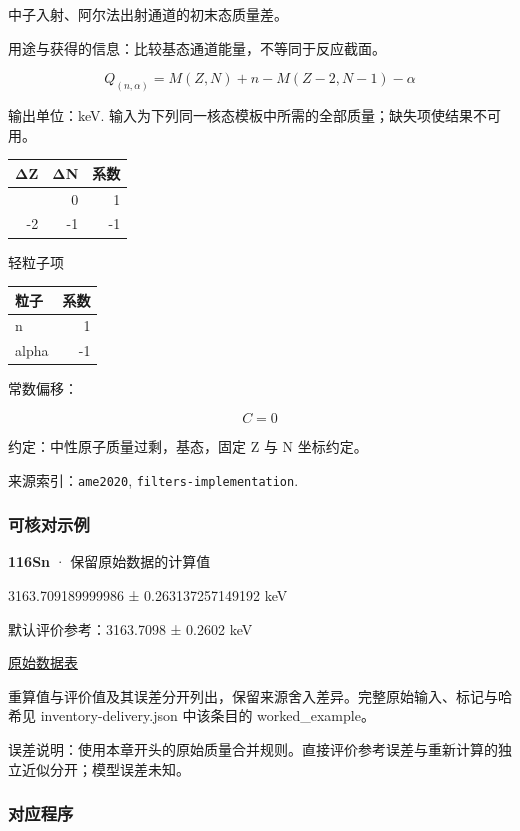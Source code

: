 \documentclass[
  11pt,
  letterpaper,
]{article}
\begin{document}
中子入射、阿尔法出射通道的初末态质量差。

用途与获得的信息：比较基态通道能量，不等同于反应截面。

\[
Q_{(n,\alpha)}=M(Z,N)+n-M(Z-2,N-1)-\alpha
\]

输出单位：keV.
输入为下列同一核态模板中所需的全部质量；缺失项使结果不可用。

\begin{longtable}[]{@{}rrr@{}}
\toprule\noalign{}
ΔZ & ΔN & 系数 \\
\midrule\noalign{}
\endhead
\bottomrule\noalign{}
\endlastfoot
0 & 0 & 1 \\
-2 & -1 & -1 \\
\end{longtable}

轻粒子项

\begin{longtable}[]{@{}lr@{}}
\toprule\noalign{}
粒子 & 系数 \\
\midrule\noalign{}
\endhead
\bottomrule\noalign{}
\endlastfoot
n & 1 \\
alpha & -1 \\
\end{longtable}

常数偏移：

\[
C=0
\]

约定：中性原子质量过剩，基态，固定 Z 与 N 坐标约定。

来源索引：\texttt{ame2020}, \texttt{filters-implementation}.

\subsubsection{可核对示例}\label{ux53efux6838ux5bf9ux793aux4f8b-19}

\textbf{116Sn} · 保留原始数据的计算值

3163.709189999986 ± 0.263137257149192 keV

默认评价参考：3163.7098 ± 0.2602 keV

\href{https://www-nds.iaea.org/amdc/ame2020/rct2_1.mas20.txt}{原始数据表}

重算值与评价值及其误差分开列出，保留来源舍入差异。完整原始输入、标记与哈希见
inventory-delivery.json 中该条目的 worked\_example。

误差说明：使用本章开头的原始质量合并规则。直接评价参考误差与重新计算的独立近似分开；模型误差未知。

\subsubsection{对应程序}\label{ux5bf9ux5e94ux7a0bux5e8f-19}
\end{document}
